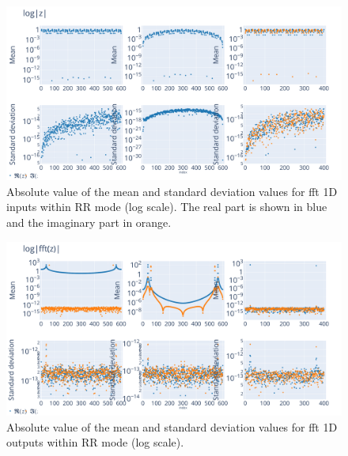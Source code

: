 \documentclass[11pt]{article}
\begin{document}
\begin{figure}
    \centering
    \includegraphics[width=\linewidth]{figure/FFT/fft_x.pdf}
    \caption{Absolute value of the mean and standard deviation values for 
    fft 1D inputs within RR mode (log scale). The real part is shown in blue and the imaginary part in orange.}
    \label{fig:fft1D_inputs}
\end{figure}

\begin{figure}
    \centering
    \includegraphics[width=\linewidth]{figure/FFT/fft_y.pdf}
    \caption{Absolute value of the mean and standard deviation values 
    for fft 1D outputs within RR mode (log scale).}
    \label{fig:fft1D_outputs}
\end{figure}

\end{document}
